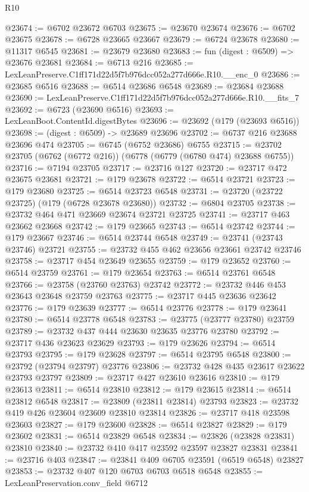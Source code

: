 \begin{lexlean}{R10}
\begin{coremodule}
@23674 := @6702 @23672 @6703
@23675 := @23670 @23674
@23676 := @6702 @23675
@23678 := @6728 @23665 @23667
@23679 := @6724 @23678
@23680 := @11317 @6545
@23681 := @23679 @23680
@23683 := fun (digest : @6509) => @23676 @23681
@23684 := @6713 @216
@23685 := LexLeanPreserve.C1ff171d22d5f7b976dcc052a277d666e.R10.__enc_0
@23686 := @23685 @6516
@23688 := @6514 @23686 @6548
@23689 := @23684 @23688
@23690 := LexLeanPreserve.C1ff171d22d5f7b976dcc052a277d666e.R10.__fits_7
@23692 := @6723 (@23690 @6516)
@23693 := LexLeanBoot.ContentId.digestBytes
@23696 := @23692 (@179 (@23693 @6516))
@23698 := (digest : @6509) -> @23689 @23696
@23702 := @6737 @216 @23688 @23696 @474
@23705 := @6745 (@6752 @23686) @6755
@23715 := @23702 @23705 (@6762 (@6772 @216)) (@6778 (@6779 (@6780 @474) @23688 @6755))
@23716 := @7194 @23705
@23717 := @23716 @127
@23720 := @23717 @472 @23675 @23681
@23721 := @179 @23678
@23722 := @6514 @23721
@23723 := @179 @23680
@23725 := @6514 @23723 @6548
@23731 := @23720 (@23722 @23725) (@179 (@6728 @23678 @23680))
@23732 := @6804 @23705
@23738 := @23732 @464 @471 @23669 @23674 @23721 @23725
@23741 := @23717 @463 @23662 @23668
@23742 := @179 @23665
@23743 := @6514 @23742
@23744 := @179 @23667
@23746 := @6514 @23744 @6548
@23749 := @23741 (@23743 @23746) @23721
@23755 := @23732 @455 @462 @23656 @23661 @23742 @23746
@23758 := @23717 @454 @23649 @23655
@23759 := @179 @23652
@23760 := @6514 @23759
@23761 := @179 @23654
@23763 := @6514 @23761 @6548
@23766 := @23758 (@23760 @23763) @23742
@23772 := @23732 @446 @453 @23643 @23648 @23759 @23763
@23775 := @23717 @445 @23636 @23642
@23776 := @179 @23639
@23777 := @6514 @23776
@23778 := @179 @23641
@23780 := @6514 @23778 @6548
@23783 := @23775 (@23777 @23780) @23759
@23789 := @23732 @437 @444 @23630 @23635 @23776 @23780
@23792 := @23717 @436 @23623 @23629
@23793 := @179 @23626
@23794 := @6514 @23793
@23795 := @179 @23628
@23797 := @6514 @23795 @6548
@23800 := @23792 (@23794 @23797) @23776
@23806 := @23732 @428 @435 @23617 @23622 @23793 @23797
@23809 := @23717 @427 @23610 @23616
@23810 := @179 @23613
@23811 := @6514 @23810
@23812 := @179 @23615
@23814 := @6514 @23812 @6548
@23817 := @23809 (@23811 @23814) @23793
@23823 := @23732 @419 @426 @23604 @23609 @23810 @23814
@23826 := @23717 @418 @23598 @23603
@23827 := @179 @23600
@23828 := @6514 @23827
@23829 := @179 @23602
@23831 := @6514 @23829 @6548
@23834 := @23826 (@23828 @23831) @23810
@23840 := @23732 @410 @417 @23592 @23597 @23827 @23831
@23841 := @23716 @403
@23847 := @23841 @409 @6705 @23591 (@6519 @6548) @23827
@23853 := @23732 @407 @120 @6703 @6703 @6518 @6548
@23855 := LexLeanPreservation.conv_field @6712

\end{coremodule}
\end{lexlean}
